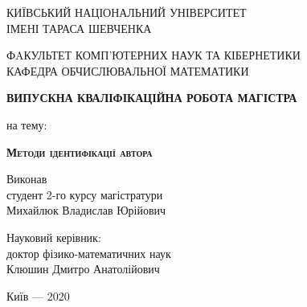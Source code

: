 \documentclass[12pt, a4paper]{extarticle}
\begin{document}
\begin{titlepage}%
	\begin{center}
		{КИЇВСЬКИЙ НАЦІОНАЛЬНИЙ УНІВЕРСИТЕТ \\ІМЕНІ ТАРАСА ШЕВЧЕНКА}\par
		{ФAКУЛЬТЕТ КОМП'ЮТЕРНИХ НАУК ТА КІБЕРНЕТИКИ\\ КАФЕДРА ОБЧИСЛЮВАЛЬНОЇ МАТЕМАТИКИ}\par
		\begin{center}
			\begin{figure}[h]
			\end{figure}
		\end{center}
		\vspace{3mm}
		\bf{\small{ВИПУСКНА КВАЛІФІКАЦІЙНА РОБОТА МАГІСТРА}}\par
	{\small{на тему:}}\par
			\vspace{10mm}
			{\LARGE{\bf{\scshape{Методи ідентифікації автора}}}}\par
			\vspace{5mm}
			{}\par %
	\end{center}
	\vfill
	\hfill
	\begin{flushright}
	\begin{minipage}[t]{85mm}
			\flushright
			Виконав\\
			студент 2-го курсу магістратури\\
			{Михайлюк Владислав Юрійович}\par
			\vspace{2ex}
			Науковий керівник:\\
			{доктор фізико-математичних наук}\\
			{Клюшин Дмитро Анатолійович}\par   
	\end{minipage}
	\end{flushright}
	\vspace{3mm}
	\begin{flushleft}
			\end{flushleft}
	\vfill
	\vspace{1mm}
	\begin{center}Київ --- 2020\end{center}
\end{titlepage}
\end{document}
